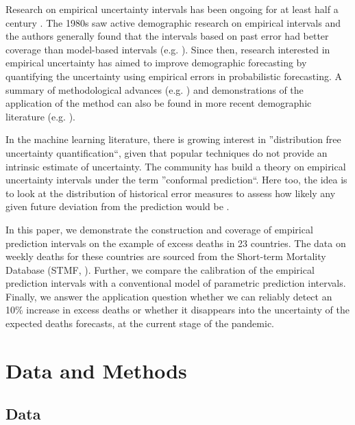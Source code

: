\documentclass[12pt]{article}
\begin{document}
Research on empirical uncertainty intervals has been ongoing for at least half a century \cite{Williams1971}. The 1980s saw active demographic research on empirical intervals and the authors generally found that the intervals based on past error had better coverage than model-based intervals (e.g. \cite{Stoto1983, Cohen1986, Smith1988}). Since then, research interested in empirical uncertainty has aimed to improve demographic forecasting by quantifying the uncertainty using empirical errors in probabilistic forecasting. A summary of methodological advances (e.g. \cite{Keilman1990, keilman2001uncertain, lee2014empirical}) and demonstrations of the application of the method can also be found in more recent demographic literature (e.g. \cite{keilman2002population, keilman2004time, keilman2004empirical, Rayer2009}).

In the machine learning literature, there is growing interest in ''distribution free uncertainty quantification``, given that popular techniques do not provide an intrinsic estimate of uncertainty. The community has build a theory on empirical uncertainty intervals under the term ''conformal prediction``. Here too, the idea is to look at the distribution of historical error measures to assess how likely any given future deviation from the prediction would be \cite{Shafer2008}.

In this paper, we demonstrate the construction and coverage of empirical prediction intervals on the example of excess deaths in 23 countries. The data on weekly deaths for these countries are sourced from the Short-term Mortality Database (STMF, \cite{Jdanov2021a}). Further, we compare the calibration of the empirical prediction intervals with a conventional model of parametric prediction intervals. Finally, we answer the application question whether we can reliably detect an 10\% increase in excess deaths or whether it disappears into the uncertainty of the expected deaths forecasts, at the current stage of the pandemic.

\section*{Data and Methods}

\subsection*{Data}
\end{document}
